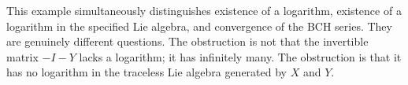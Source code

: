 This example simultaneously distinguishes existence of a logarithm,
existence of a logarithm in the specified Lie algebra, and convergence of
the BCH series. They are genuinely different questions. The obstruction is
not that the invertible matrix $-I-Y$ lacks a logarithm; it has infinitely
many. The obstruction is that it has no logarithm in the traceless Lie
algebra generated by $X$ and $Y$.
